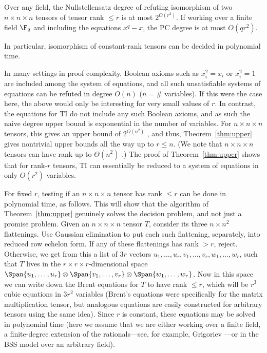 \begin{theorem} \label{thm:upper}
Over any field, the Nullstellensatz degree of refuting isomorphism of two $n \times n \times n$ tensors of tensor rank $\leq r$ is at most $2^{O(r^2)}$. If working over a finite field $\F_q$ and including the equations $x^q - x$, the PC degree is at most $O(qr^2)$. 

In particular, isomorphism of constant-rank tensors can be decided in polynomial time.
\end{theorem}

\begin{remark} \label{rmk:boolean}
In many settings in proof complexity, Boolean axioms such as $x_i^2 = x_i$ or $x_i^2 = 1$ are included among the system of equations, and all such unsatisfiable systems of equations can be refuted in degree $O(n)$ ($n=$\# variables). If this were the case here, the above would only be interesting for very small values of $r$. In contrast, the equations for \textsc{TI} do not include any such Boolean axioms, and as such the naive degree upper bound is exponential in the number of variables. For $n \times n \times n$ tensors, this gives an upper bound of $2^{O(n^2)}$ \cite{sombra}, and thus, Theorem~\ref{thm:upper} gives nontrivial upper bounds all the way up to $r \leq n$. (We note that $n \times n \times n$ tensors can have rank up to $\Theta(n^2)$ \cite{lickteigTypical}.) The proof of Theorem~\ref{thm:upper} shows that for rank-$r$ tensors, \textsc{TI} can essentially be reduced to a system of equations in only $O(r^2)$ variables.
\end{remark}

\begin{remark} \label{rmk:rank}
For fixed $r$, testing if an $n \times n \times n$ tensor has rank $\leq r$ can be done in polynomial time, as follows. This will show that the algorithm of Theorem~\ref{thm:upper} genuinely solves the decision problem, and not just a promise problem. Given an $n \times n \times n$ tensor $T$, consider its three $n \times n^2$ flattenings. Use Gaussian elimination to put each such flattening, separately, into reduced row echelon form. If any of these flattenings has rank $> r$, reject. Otherwise, we get from this a list of $3r$ vectors $u_1, \dotsc, u_r, v_1, \dotsc, v_r, w_1, \dotsc, w_r$, such that $T$ lives in the $r \times r \times r$-dimensional space $\Span\{u_1, \dotsc, u_r\} \otimes \Span\{v_1, \dotsc, v_r\} \otimes \Span\{w_1, \dotsc, w_r\}$. Now in this space we can write down the Brent equations \cite{brent} for $T$ to have rank $\leq r$, which will be $r^3$ cubic equations in $3r^2$ variables (Brent's equations \cite[(5.06)]{brent} were specifically for the matrix multiplication tensor, but analogous equations are easily constructed for arbitrary tensors using the same idea). Since $r$ is constant, these equations may be solved in polynomial time (here we assume that we are either working over a finite field, a finite-degree extension of the rationals---see, for example, Grigoriev \cite{grigoriev}---or in the BSS model over an arbitrary field).
\end{remark}


